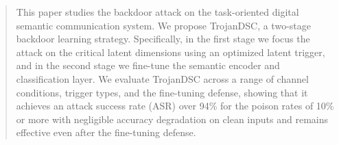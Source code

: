 \documentclass[journal]{IEEEtran}
\begin{document}
\begin{abstract}


This paper studies the backdoor attack on the task-oriented digital semantic communication system.
We propose TrojanDSC, a two-stage backdoor learning strategy. Specifically, in the first stage we focus the attack on the critical latent dimensions using an optimized latent trigger, and in the second stage we fine-tune the semantic encoder and classification layer. We evaluate TrojanDSC across a range of channel conditions, trigger types, and the fine-tuning defense, showing that it achieves an attack success rate (ASR) over 94\% for the poison rates of 10\% or more with negligible accuracy degradation on clean inputs and remains effective even after the fine-tuning defense. 









\end{abstract}
\end{document}
